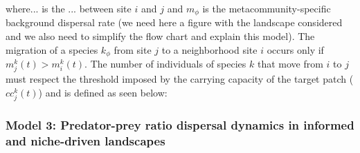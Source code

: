 %
%
%
%
%

where... is the ... between site $i$ and $j$ and $m_{\mathcal{\phi}}$
is the metacommunity-specific background dispersal rate (we need here
a figure with the landscape considered and we also need to simplify
the flow chart and explain this model). The migration of a species
$k_{\mathcal{\phi}}$ from site $j$ to a neighborhood site $i$ occurs
only if $m_{j}^k(t) > m_{i}^k(t)$. The number of individuals of
species $k$ that move from $i$ to $j$ must respect the threshold
imposed by the carrying capacity of the target patch ($cc_j^k(t)$) and
is defined as seen below:

\subsubsection{Model 3: Predator-prey ratio dispersal dynamics in informed and niche-driven landscapes}


